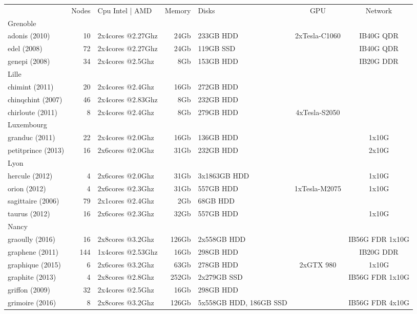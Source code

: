 \begin{tabular}{|l|r|l|r|p{4.9cm}|c|c|}
  & Nodes & Cpu Intel | AMD & Memory & Disks & GPU & Network \\ 
Grenoble &  &  &  &  &  &  \\
adonis (2010) & 10 & 2x4cores @2.27Ghz & 24Gb &  233GB HDD & 2xTesla-C1060 & IB40G QDR \\
edel (2008) & 72 & 2x4cores @2.27Ghz & 24Gb &  119GB SSD &  & IB40G QDR \\
genepi (2008) & 34 & 2x4cores @2.5Ghz & 8Gb &  153GB HDD &  & IB20G DDR \\
Lille &  &  &  &  &  &  \\
chimint (2011) & 20 & 2x4cores @2.4Ghz & 16Gb &  272GB HDD &  &  \\
chinqchint (2007) & 46 & 2x4cores @2.83Ghz & 8Gb &  232GB HDD &  &  \\
chirloute (2011) & 8 & 2x4cores @2.4Ghz & 8Gb &  279GB HDD & 4xTesla-S2050 &  \\
Luxembourg &  &  &  &  &  &  \\
granduc (2011) & 22 & 2x4cores @2.0Ghz & 16Gb &  136GB HDD &  &  1x10G \\
petitprince (2013) & 16 & 2x6cores @2.0Ghz & 31Gb &  232GB HDD &  &  2x10G \\
Lyon &  &  &  &  &  &  \\
hercule (2012) & 4 & 2x6cores @2.0Ghz & 31Gb &  3x1863GB HDD &  &  1x10G \\
orion (2012) & 4 & 2x6cores @2.3Ghz & 31Gb &  557GB HDD & 1xTesla-M2075 &  1x10G \\
sagittaire (2006) & 79 & 2x1cores @2.4Ghz & 2Gb &  68GB HDD &  &  \\
taurus (2012) & 16 & 2x6cores @2.3Ghz & 32Gb &  557GB HDD &  &  1x10G \\
Nancy &  &  &  &  &  &  \\
graoully (2016) & 16 & 2x8cores @3.2Ghz & 126Gb &  2x558GB HDD &  & IB56G FDR 1x10G \\
graphene (2011) & 144 & 1x4cores @2.53Ghz & 16Gb &  298GB HDD &  & IB20G DDR \\
graphique (2015) & 6 & 2x6cores @3.2Ghz & 63Gb &  278GB HDD & 2xGTX 980 &  1x10G \\
graphite (2013) & 4 & 2x8cores @2.8Ghz & 252Gb &  2x279GB SSD &  & IB56G FDR 1x10G \\
griffon (2009) & 32 & 2x4cores @2.5Ghz & 16Gb &  298GB HDD &  &  \\
grimoire (2016) & 8 & 2x8cores @3.2Ghz & 126Gb &  5x558GB HDD, 186GB SSD &  & IB56G FDR 4x10G \\

\end{tabular}
